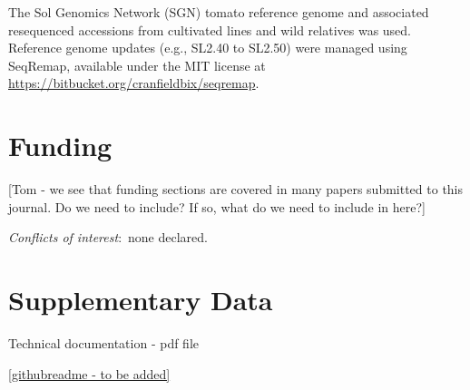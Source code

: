 \documentclass[unnumsec,webpdf,contemporary,large]{oup-authoring-template}%
\theoremstyle{thmstyleone}%
\theoremstyle{thmstyletwo}%
\theoremstyle{thmstylethree}%
\begin{document}
The Sol Genomics Network (SGN) tomato reference genome and associated resequenced accessions from cultivated lines and wild relatives was used. Reference genome updates (e.g., SL2.40 to SL2.50) were managed using SeqRemap, available under the MIT license at \url{https://bitbucket.org/cranfieldbix/seqremap}.

\vspace{3mm}


\section{Funding}

[Tom - we see that funding sections are covered in many papers submitted to this journal. Do we need to include? If so, what do we need to include in here?]

\vspace{3mm}

\noindent\textit{Conflicts of interest}:~none declared.

\section{Supplementary Data}

Technical documentation - pdf file 

\noindent\url{[githubreadme - to be added]}






\end{document}
